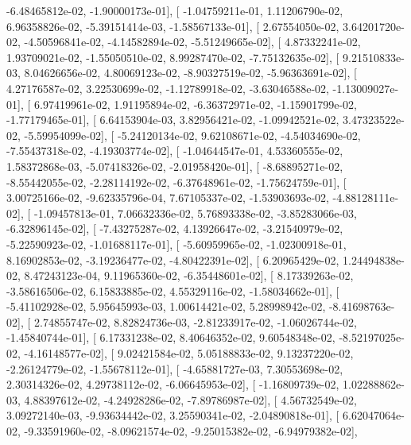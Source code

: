 \documentclass{article}
\begin{document}
         -6.48465812e-02,  -1.90000173e-01],
       [ -1.04759211e-01,   1.11206790e-02,   6.96358826e-02,
         -5.39151414e-03,  -1.58567133e-01],
       [  2.67554050e-02,   3.64201720e-02,  -4.50596841e-02,
         -4.14582894e-02,  -5.51249665e-02],
       [  4.87332241e-02,   1.93709021e-02,  -1.55050510e-02,
          8.99287470e-02,  -7.75132635e-02],
       [  9.21510833e-03,   8.04626656e-02,   4.80069123e-02,
         -8.90327519e-02,  -5.96363691e-02],
       [  4.27176587e-02,   3.22530699e-02,  -1.12789918e-02,
         -3.63046588e-02,  -1.13009027e-01],
       [  6.97419961e-02,   1.91195894e-02,  -6.36372971e-02,
         -1.15901799e-02,  -1.77179465e-01],
       [  6.64153904e-03,   3.82956421e-02,  -1.09942521e-02,
          3.47323522e-02,  -5.59954099e-02],
       [ -5.24120134e-02,   9.62108671e-02,  -4.54034690e-02,
         -7.55437318e-02,  -4.19303774e-02],
       [ -1.04644547e-01,   4.53360555e-02,   1.58372868e-03,
         -5.07418326e-02,  -2.01958420e-01],
       [ -8.68895271e-02,  -8.55442055e-02,  -2.28114192e-02,
         -6.37648961e-02,  -1.75624759e-01],
       [  3.00725166e-02,  -9.62335796e-04,   7.67105337e-02,
         -1.53903693e-02,  -4.88128111e-02],
       [ -1.09457813e-01,   7.06632336e-02,   5.76893338e-02,
         -3.85283066e-03,  -6.32896145e-02],
       [ -7.43275287e-02,   4.13926647e-02,  -3.21540979e-02,
         -5.22590923e-02,  -1.01688117e-01],
       [ -5.60959965e-02,  -1.02300918e-01,   8.16902853e-02,
         -3.19236477e-02,  -4.80422391e-02],
       [  6.20965429e-02,   1.24494838e-02,   8.47243123e-04,
          9.11965360e-02,  -6.35448601e-02],
       [  8.17339263e-02,  -3.58616506e-02,   6.15833885e-02,
          4.55329116e-02,  -1.58034662e-01],
       [ -5.41102928e-02,   5.95645993e-03,   1.00614421e-02,
          5.28998942e-02,  -8.41698763e-02],
       [  2.74855747e-02,   8.82824736e-03,  -2.81233917e-02,
         -1.06026744e-02,  -1.45840744e-01],
       [  6.17331238e-02,   8.40646352e-02,   9.60548348e-02,
         -8.52197025e-02,  -4.16148577e-02],
       [  9.02421584e-02,   5.05188833e-02,   9.13237220e-02,
         -2.26124779e-02,  -1.55678112e-01],
       [ -4.65881727e-03,   7.30553698e-02,   2.30314326e-02,
          4.29738112e-02,  -6.06645953e-02],
       [ -1.16809739e-02,   1.02288862e-03,   4.88397612e-02,
         -4.24928286e-02,  -7.89786987e-02],
       [  4.56732549e-02,   3.09272140e-03,  -9.93634442e-02,
          3.25590341e-02,  -2.04890818e-01],
       [  6.62047064e-02,  -9.33591960e-02,  -8.09621574e-02,
         -9.25015382e-02,  -6.94979382e-02],
\end{document}

